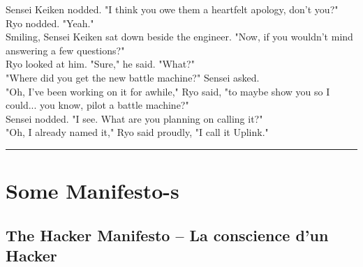 \documentclass[11pt,twoside,a4paper]{book}
\begin{document}
\begin{multicols*}{2}
Sensei Keiken nodded. "I think you owe them a heartfelt apology, don't you?" ~\\

Ryo nodded. "Yeah." ~\\

Smiling, Sensei Keiken sat down beside the engineer. "Now, if you wouldn't mind answering a few questions?" ~\\

Ryo looked at him. "Sure," he said. "What?" ~\\

"Where did you get the new battle machine?" Sensei asked. ~\\

"Oh, I've been working on it for awhile," Ryo said, "to maybe show you so I could... you know, pilot a battle machine?" ~\\

Sensei nodded. "I see. What are you planning on calling it?" ~\\

"Oh, I already named it," Ryo said proudly, "I call it Uplink." ~\\

\begin{center} \rule{0.45\textwidth}{0.01cm} \end{center}

\end{multicols*}

\clearpage

\chapter{Some Manifesto-s}

\section{The Hacker Manifesto -- La conscience d'un Hacker}
\end{document}
